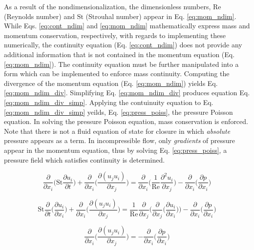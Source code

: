 \documentclass[10pt, letterpaper]{article}
\begin{document}
As a result of the nondimensionalization, the dimensionless numbers, $\text{Re}$ (Reynolds number) and $\text{St}$ (Strouhal number) appear in Eq. \ref{eq:mom_ndim}. While Eqs. \ref{eq:cont_ndim} and \ref{eq:mom_ndim} mathematically express mass and momentum conservation, respectively, with regards to implementing these numerically, the continuity equation (Eq. \ref{eq:cont_ndim}) does not provide any additional information that is not contained in the momentum equation (Eq. \ref{eq:mom_ndim}). The continuity equation must be further manipulated into a form which can be implemented to enforce mass continuity. Computing the divergence of the momentum equation (Eq. \ref{eq:mom_ndim}) yields Eq. \ref{eq:mom_ndim_div}. Simplifying Eq. \ref{eq:mom_ndim_div} produces equation Eq. \ref{eq:mom_ndim_div_simp}. Applying the contuinuity equation to Eq. \ref{eq:mom_ndim_div_simp} yeilds, Eq. \ref{eq:press_poiss}, the pressure Poisson equation. In solving the pressure Poisson equation, mass conservation is enforced. Note that there is not a fluid equation of state for closure in which \textit{absolute} pressure appears as a term. In incompressible flow, only \textit{gradients} of pressure appear in the momentum equation, thus by solving Eq. \ref{eq:press_poiss}, a pressure field which satisfies continuity is determined.

\begin{equation}
  \frac{\partial}{\partial{x_{i}}}\bigg(\text{St}\frac{\partial{u_{i}}}{\partial{t}}\bigg) + \frac{\partial}{\partial{x_{i}}}\bigg(\frac{\partial{(u_{j}u_{i})}}{\partial{x_{j}}}\bigg) =\frac{\partial}{\partial{x_{i}}}\bigg(\frac{1}{\text{Re}}\frac{\partial^{2}{u_{i}}}{\partial{x_{j}}}\bigg) -\frac{\partial}{\partial{x_{i}}}\bigg(\frac{\partial{p}}{\partial{x_{i}}}\bigg)
  \label{eq:mom_ndim_div}
\end{equation}


\begin{equation}
  \text{St}\frac{\partial}{\partial{t}}\bigg(\frac{\partial{u_{i}}}{\partial{x_{i}}}\bigg) + \frac{\partial}{\partial{x_{i}}}\bigg(\frac{\partial{(u_{j}u_{i})}}{\partial{x_{j}}}\bigg) = \frac{1}{\text{Re}}\frac{\partial}{\partial{x_{j}}}\bigg(\frac{\partial}{\partial{x_{j}}}\bigg(\frac{\partial{u_{i}}}{\partial{x_{i}}}\bigg)\bigg) -\frac{\partial}{\partial{x_{i}}}\bigg(\frac{\partial{p}}{\partial{x_{i}}}\bigg)
  \label{eq:mom_ndim_div_simp}
\end{equation}

\begin{equation}
  \boxed{
    \frac{\partial}{\partial{x_{i}}}\bigg(\frac{\partial(u_{j}u_{i})}{\partial{x_{j}}}\bigg) = - \frac{\partial}{\partial{x_{i}}}\bigg(\frac{\partial{p}}{\partial{x_{i}}}\bigg)
  }
  \label{eq:press_poiss}
\end{equation}
\end{document}
